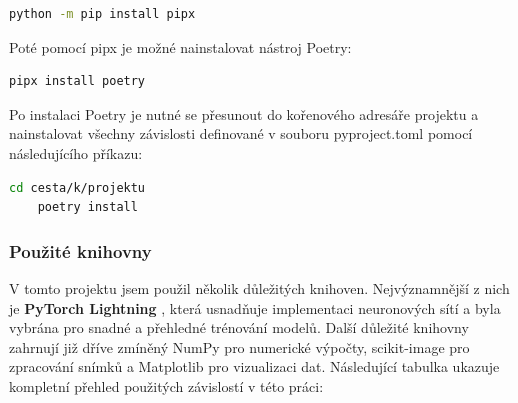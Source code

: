 \documentclass[male,czech,api_ing]{thesis}
\begin{document}
\begin{lstlisting}[language=bash, caption={Instalace pipx}]
    python -m pip install pipx
\end{lstlisting}

Poté pomocí pipx je možné nainstalovat nástroj Poetry:

\begin{lstlisting}[language=bash, caption={Instalace Poetry}]
    pipx install poetry
\end{lstlisting}

Po instalaci Poetry je nutné se přesunout do kořenového adresáře projektu a nainstalovat všechny závislosti definované v souboru pyproject.toml pomocí následujícího příkazu:

\begin{lstlisting}[language=bash, caption={Instalace virtuálního prostředí a knihoven}]
    cd cesta/k/projektu
    poetry install
\end{lstlisting}

\subsubsection{Použité knihovny}
V tomto projektu jsem použil několik důležitých knihoven. Nejvýznamnější z nich je \textbf{PyTorch Lightning} \cite{Pytorchlightning}, která usnadňuje implementaci neuronových sítí a byla vybrána pro snadné a přehledné trénování modelů. Další důležité knihovny zahrnují již dříve zmíněný NumPy pro numerické výpočty, scikit-image \cite{Scikit} pro zpracování snímků a Matplotlib \cite{Matplotlib} pro vizualizaci dat. Následující tabulka ukazuje kompletní přehled použitých závislostí v této práci:
\end{document}
